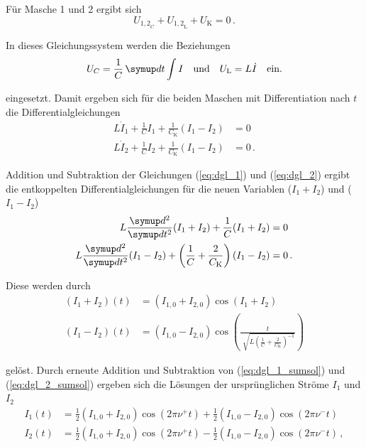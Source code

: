 Für Masche 1 und 2 ergibt sich
\begin{equation}
    U_{{1,2}_{C}} + U_{{1,2}_\text{L}} + U_\text{K} = 0 \,.
\end{equation}

In dieses Gleichungssystem werden die Beziehungen
\begin{equation} 
    U_{C} = \frac{1}{C} \dif{t} \int I \quad\text{und}\quad U_\text{L} = L \dot{I} \quad\text{ein.}
\end{equation}

eingesetzt. Damit ergeben sich für die beiden Maschen mit Differentiation nach $t$ die Differentialgleichungen
\begin{align}  
    L {\dot{I}}_{1} + \frac{1}{C} I_{1} + \frac{1}{C_\text{K}} (I_{1} - I_{2})  &= 0 \label{eq:dgl_1} \\
    L {\dot{I}}_{2} + \frac{1}{C} I_{2} + \frac{1}{C_\text{K}} (I_{1} - I_{2})  &= 0 \label{eq:dgl_2} \,.
\end{align}

Addition und Subtraktion der Gleichungen (\ref{eq:dgl_1}) und (\ref{eq:dgl_2}) ergibt die entkoppelten 
Differentialgleichungen für die neuen Variablen ($I_{1}+I_{2}$) und ($I_{1}-I_{2}$)
\begin{align} 
    L \frac {\dif{^2}} {\dif{t^2}} (I_{1} + I_{2}) + \frac{1}{C} (I_{1} + I_{2})  &= 0 \label{eq:dgl_1_entk} \\
    L \frac {\dif{^2}} {\dif{t^2}} (I_{1} - I_{2}) + \left( \frac{1}{C} + \frac{2}{C_\text{K}} \right) (I_{1} - I_{2})  &= 0 \label{eq:dgl_2_entk} \,.
\end{align}

Diese werden durch
\begin{align}
    (I_{1} + I_{2})(t) &= (I_{1,0} + I_{2,0}) \cos(I_{1} + I_{2}) \label{eq:dgl_1_sumsol} \\
    (I_{1} - I_{2})(t) &= (I_{1,0} - I_{2,0}) \cos \left( \frac {t} {{\sqrt [] {L \left( \frac{1}{C} + \frac{2}{C_\text{K}} \right)^{-1} }}} \right) \label{eq:dgl_2_sumsol}
\end{align}

gelöst. Durch erneute Addition und Subtraktion von (\ref{eq:dgl_1_sumsol}) und (\ref{eq:dgl_2_sumsol}) ergeben sich die Lösungen 
der ursprünglichen Ströme $I_{1}$ und $I_{2}$
\begin{align}
    I_{1}(t) &= \frac{1}{2} (I_{1,0} + I_{2,0}) \cos(2 \pi \nu^+ t)  +  \frac{1}{2} (I_{1,0} - I_{2,0}) \cos(2 \pi \nu^- t) \label{eq:dgl_1_sol} \\
    I_{2}(t) &= \frac{1}{2} (I_{1,0} + I_{2,0}) \cos(2 \pi \nu^+ t)  -  \frac{1}{2} (I_{1,0} - I_{2,0}) \cos(2 \pi \nu^- t) \label{eq:dgl_2_sol} \,,
\end{align}

